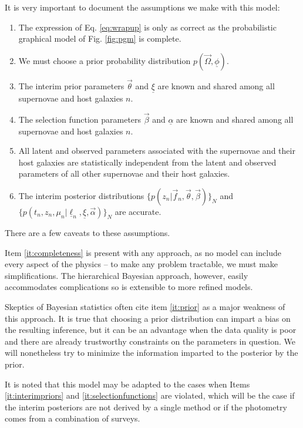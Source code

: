 \documentclass[12pt, onecolumn]{emulateapj}
\newcommand{\textul}{\underline}
\begin{document}
It is very important to document the assumptions we make with this model:
\begin{enumerate}
	\item\label{it:completeness} The expression of Eq. \ref{eq:wrapup} is only as correct as the probabilistic graphical model of Fig. \ref{fig:pgm} is complete.
	\item\label{it:prior} We must choose a prior probability distribution $p(\vec{\Omega}, \textul{\phi})$.
	\item\label{it:interimpriors} The interim prior parameters $\vec{\theta}$ and $\textul{\xi}$ are known and shared among all supernovae and host galaxies $n$.
	\item\label{it:selectionfunctions} The selection function parameters $\vec{\beta}$ and $\textul{\alpha}$ are known and shared among all supernovae and host galaxies $n$.
	\item\label{it:independence} All latent and observed parameters associated with the supernovae and their host galaxies are statistically independent from the latent and observed parameters of all other supernovae and their host galaxies.
	\item\label{it:accuracy} The interim posterior distributions $\{p(z_{n} | \vec{f}_{n}, \vec{\theta}, \vec{\beta})\}_{N}$ and $\{p(t_{n}, z_{n}, \mu_{n} | \textul{\ell}_{n}, \textul{\xi}, \vec{\alpha})\}_{N}$ are accurate.
\end{enumerate}
There are a few caveats to these assumptions.  

Item \ref{it:completeness} is present with any approach, as no model can include every aspect of the physics -- to make any problem tractable, we must make simplifications.  The hierarchical Bayesian approach, however, easily accommodates complications so is extensible to more refined models.

Skeptics of Bayesian statistics often cite item \ref{it:prior} as a major weakness of this approach.  It is true that choosing a prior distribution can impart a bias on the resulting inference, but it can be an advantage when the data quality is poor and there are already trustworthy constraints on the parameters in question.  We will nonetheless try to minimize the information imparted to the posterior by the prior.

It is noted that this model may be adapted to the cases when Items \ref{it:interimpriors} and \ref{it:selectionfunctions} are violated, which will be the case if the interim posteriors are not derived by a single method or if the photometry comes from a combination of surveys.  
\end{document}

